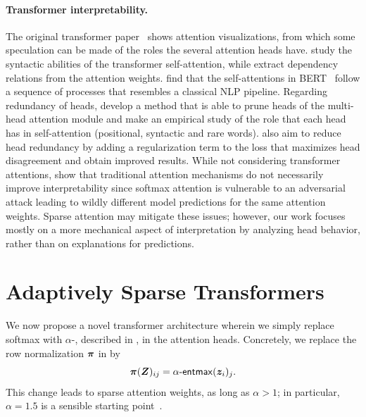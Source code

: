 \paragraph*{Transformer interpretability.} The original transformer
paper~\citep{vaswani2017attention} shows attention visualizations,
from which some speculation can be made of the roles the several
attention heads have. \citet{marecek-rosa-2018-extracting} study the
syntactic abilities of the transformer self-attention, while
\citet{raganato2018analysis} extract dependency relations from the
attention weights. \citet{bert-rediscovers} find that the
self-attentions in BERT~\citep{devlin2018bert} follow a sequence of
processes that resembles a classical NLP pipeline. Regarding
redundancy of heads, \citet{specialized} develop a method that is
able to prune heads of the multi-head attention module and make an
empirical study of the role that each head has in self-attention
(positional, syntactic and rare words). \citet{li2018multi} also aim
to reduce head redundancy by adding a regularization term to the loss
that maximizes head disagreement and obtain improved results. While
not considering transformer attentions, \citet{jain2019attention}
show that traditional attention mechanisms do not necessarily improve
interpretability since softmax attention is vulnerable to an
adversarial attack leading to wildly different model predictions for
the same attention weights. Sparse attention may mitigate these
issues; however, our work focuses mostly on a more mechanical aspect
of interpretation by analyzing head behavior, rather than on
explanations for predictions.

\section{Adaptively Sparse Transformers}
\label{sec:adaptive}

\noindent We now propose a novel transformer architecture wherein we simply replace
softmax with $\alpha$-\entmaxtext{}, described in
, in the attention heads. Concretely, we
replace the row normalization $\bm{\pi}$ in 
by
%
\begin{equation}
    \bm{\pi}(\bm{Z})_{ij} = \mathop{\mathsf{\alpha}\textnormal{-}\mathsf{entmax}}(\bm{z}_i)_j.
\end{equation}
%
This change leads to sparse attention weights, as long as
$\alpha>1$; in particular, $\alpha=1.5$ is a sensible starting
point~\citep{entmax}.

